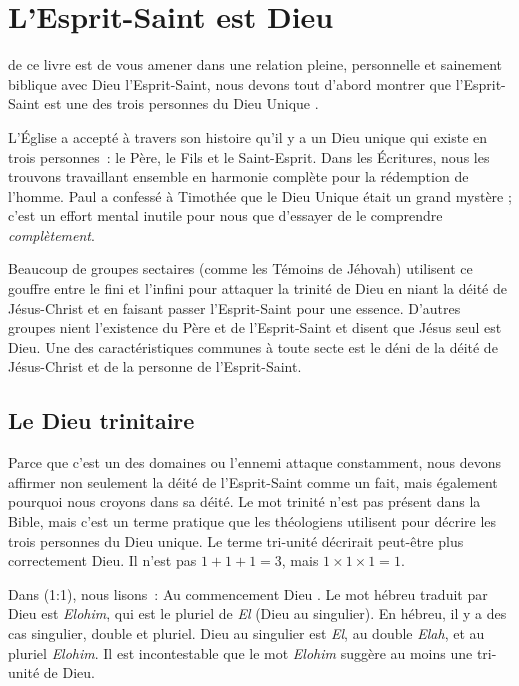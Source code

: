 \chapter{L'Esprit-Saint est Dieu}

 de ce livre est de vous amener
 dans une relation pleine, personnelle et sainement biblique avec
 Dieu l'Esprit-Saint, nous devons tout d'abord montrer que l'Esprit-Saint
 est une des trois personnes du Dieu Unique
 .

L'Église a accepté à travers son histoire qu'il y a un Dieu unique
 qui existe en trois personnes~: le Père, le Fils et le Saint-Esprit.
 Dans les Écritures, nous les trouvons travaillant ensemble en harmonie
 complète pour la rédemption de l'homme.
 Paul a confessé à Timothée que le Dieu Unique était un grand mystère ;
 c'est un effort mental inutile pour nous que d'essayer de le comprendre
 \emph{complètement}.

Beaucoup de groupes sectaires (comme les Témoins de Jéhovah) utilisent
 ce gouffre entre le fini et l'infini pour attaquer la trinité de Dieu
 en niant la déité de Jésus-Christ et en faisant passer l'Esprit-Saint
 pour une essence.
 D'autres groupes nient l'existence du Père et de l'Esprit-Saint et disent
 que Jésus seul est Dieu.
 Une des caractéristiques communes à toute secte est le déni de la déité
 de Jésus-Christ et de la personne de l'Esprit-Saint.

\section*{Le Dieu trinitaire}

Parce que c'est un des domaines ou l'ennemi attaque constamment, nous devons
 affirmer non seulement la déité de l'Esprit-Saint comme un fait,
 mais également pourquoi nous croyons dans sa déité.
 Le mot \og trinité \fg{} n'est pas présent dans la Bible, mais c'est un
 terme pratique que les théologiens utilisent pour décrire les trois personnes
 du Dieu unique.
 Le terme \og tri-unité \fg{} décrirait peut-être plus correctement Dieu.
 Il n'est pas $1 + 1 + 1 = 3$, mais $1 \times 1 \times 1 = 1$.

Dans (1:1), nous lisons~:
 \og Au commencement Dieu \fg{}.
 Le mot hébreu traduit par \og Dieu \fg{} est \emph{Elohim}, qui est
 le pluriel de \emph{El} (Dieu au singulier).
 En hébreu, il y a des cas singulier, double et pluriel.
 \og Dieu \fg{} au singulier est \emph{El}, au double \emph{Elah},
 et au pluriel \emph{Elohim}.
 Il est incontestable que le mot \emph{Elohim} suggère au moins
 une tri-unité de Dieu.

